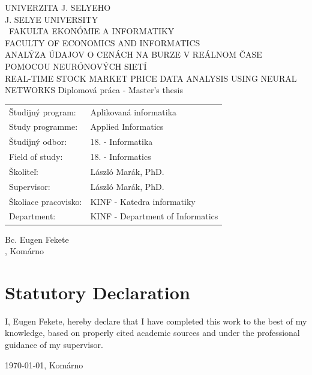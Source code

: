 \documentclass[a4paper,oneside,onecolumn,12pt]{book}
\newcommand{\dotsignline}[1]{%
  \makebox[.5\linewidth][c]{%
    \xleaders\hbox to .2em{\d{}}\hfill\d{}
  }\\[-0.2em]
  \makebox[.5\linewidth][c]{#1}%
}
\begin{document}
\begin{minipage}[c][\textheight-1cm][c]{\textwidth}
	{\centering
	{\large UNIVERZITA J. SELYEHO\\J. SELYE UNIVERSITY}\\
	\vskip0.5cm
	{\ FAKULTA EKONÓMIE A INFORMATIKY\\FACULTY OF ECONOMICS AND INFORMATICS}\\
	\vfill
	{\Large ANALÝZA ÚDAJOV O CENÁCH NA BURZE V REÁLNOM ČASE POMOCOU NEURÓNOVÝCH SIETÍ}\\
	\vskip0.5cm
	{\Large REAL-TIME STOCK MARKET PRICE DATA ANALYSIS USING NEURAL NETWORKS}
	\vskip0.5cm
	Diplomová práca - Master's thesis\\
	\vfill
	\begin{tabular}{ll}
		Študijný program:    & Aplikovaná informatika \\
		Study programme:  	 & Applied Informatics\\
		Študijný odbor:      & 18. - Informatika\\
		Field of study:      & 18. - Informatics\\
		Školiteľ:            & László Marák, PhD.\\
		Supervisor:          & László Marák, PhD.\\
		Školiace pracovisko: & KINF - Katedra informatiky\\
		Department: 		 & KINF - Department of Informatics\\
	\end{tabular}
	\vfill
	Bc. Eugen Fekete\\
	\hfill\the\year{}, Komárno\hfill
	}
	\thispagestyle{empty}
\end{minipage}
\let\ps@plain\ps@empty
\makeatother
\endgroup
\thispagestyle{empty}
{

\pagebreak
}

\section*{Statutory Declaration}
\thispagestyle{empty}
I, Eugen Fekete, hereby declare that I have completed this work to the best of my knowledge, based on properly cited academic sources and under the professional guidance of my supervisor.

\vspace{2\baselineskip}
\noindent
\begin{minipage}[t]{0.45\linewidth}
  \today, Komárno
\end{minipage}%
\hfill
\begin{minipage}[t]{0.45\linewidth}
  \dotsignline{signature}
\end{minipage}
\pagebreak
\end{document}
